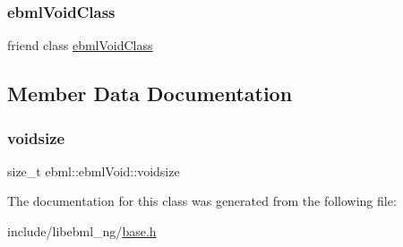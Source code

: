 \subsubsection{\texorpdfstring{ebml\+Void\+Class}{ebmlVoidClass}}
{\footnotesize\ttfamily friend class \mbox{\hyperlink{classebml_1_1ebmlVoidClass}{ebml\+Void\+Class}}\hspace{0.3cm}{\ttfamily [friend]}}



\subsection{Member Data Documentation}
\mbox{\label{classebml_1_1ebmlVoid_a62a54e4b5ef5acf454f0240db8ee6c90}} 
\subsubsection{\texorpdfstring{voidsize}{voidsize}}
{\footnotesize\ttfamily size\+\_\+t ebml\+::ebml\+Void\+::voidsize}



The documentation for this class was generated from the following file\+:\begin{DoxyCompactItemize}
\item 
include/libebml\+\_\+ng/\mbox{\hyperlink{base_8h}{base.\+h}}\end{DoxyCompactItemize}
